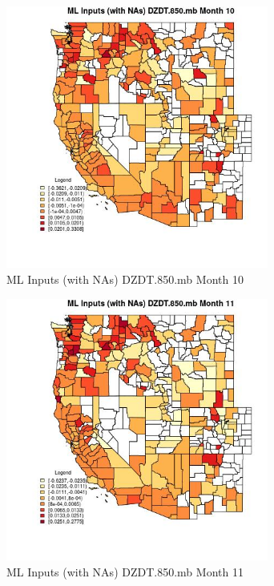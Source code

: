 \begin{figure} 
\centering  
\includegraphics[width=0.77\textwidth]{Code_Outputs/Report_ML_input_PM25_Step4_part_f_de_duplicated_aveswNAs_CountyDZDT850mbmedianMonth10.jpg} 
\caption{\label{fig:Report_ML_input_PM25_Step4_part_f_de_duplicated_aveswNAsCountyDZDT850mbmedianMonth10}ML Inputs (with NAs) DZDT.850.mb Month 10} 
\end{figure} 
 

\begin{figure} 
\centering  
\includegraphics[width=0.77\textwidth]{Code_Outputs/Report_ML_input_PM25_Step4_part_f_de_duplicated_aveswNAs_CountyDZDT850mbmedianMonth11.jpg} 
\caption{\label{fig:Report_ML_input_PM25_Step4_part_f_de_duplicated_aveswNAsCountyDZDT850mbmedianMonth11}ML Inputs (with NAs) DZDT.850.mb Month 11} 
\end{figure} 
 

